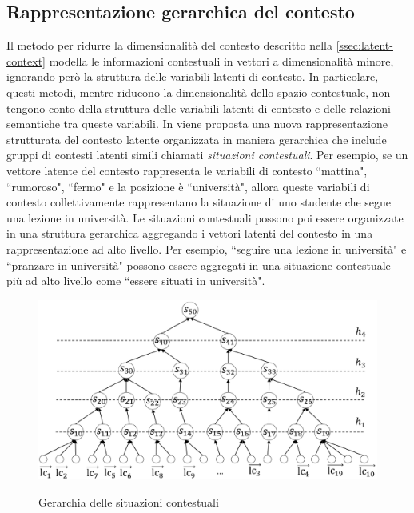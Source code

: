 \subsection{Rappresentazione gerarchica del contesto}
\label{ssec:hierarchical}
Il metodo per ridurre la dimensionalità del contesto descritto nella \autoref{ssec:latent-context} modella le informazioni contestuali in vettori a dimensionalità minore, ignorando però la struttura delle variabili latenti di contesto. In particolare, questi metodi, mentre riducono la dimensionalità dello spazio contestuale, non tengono conto della struttura delle variabili latenti di contesto e delle relazioni semantiche tra queste variabili. In \cite{hierarchical-context} viene proposta una nuova rappresentazione strutturata del contesto latente organizzata in maniera gerarchica che include gruppi di contesti latenti simili chiamati \textit{situazioni contestuali}. Per esempio, se un vettore latente del contesto rappresenta le variabili di contesto ``mattina", ``rumoroso", ``fermo" e la posizione è ``università", allora queste variabili di contesto collettivamente rappresentano la situazione di uno studente che segue una lezione in università. Le situazioni contestuali possono poi essere organizzate in una struttura gerarchica aggregando i vettori latenti del contesto in una rappresentazione ad alto livello. Per esempio, ``seguire una lezione in università" e ``pranzare in università" possono essere aggregati in una situazione contestuale più ad alto livello come ``essere situati in università".

\begin{figure}
 \centering
  \includegraphics[scale=0.70]{immagini/hierarchical.png}
  \caption{Gerarchia delle situazioni contestuali}
  \label{fig:hierarchical}
  \cite{hierarchical-context}
\end{figure}

